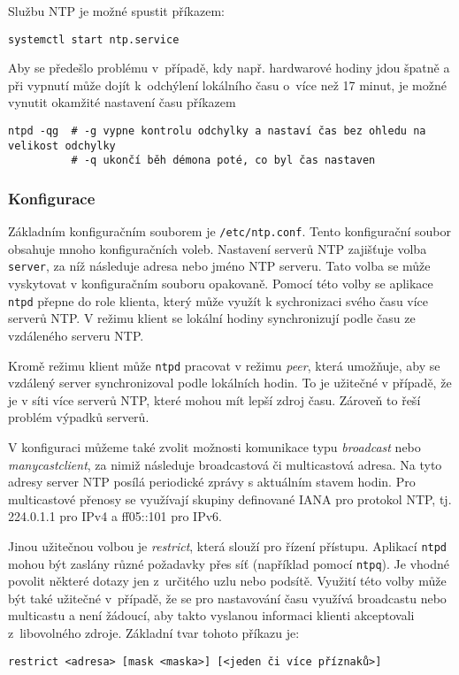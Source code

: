 Službu NTP je možné spustit příkazem:
\begin{verbatim}
systemctl start ntp.service
\end{verbatim}
Aby se předešlo problému v~případě, kdy např. hardwarové hodiny jdou špatně a při vypnutí může dojít k~odchýlení lokálního času o~více než 17 minut, je možné vynutit okamžité nastavení času příkazem
\begin{verbatim}
ntpd -qg  # -g vypne kontrolu odchylky a nastaví čas bez ohledu na velikost odchylky
          # -q ukončí běh démona poté, co byl čas nastaven
\end{verbatim}

\subsubsection{Konfigurace}
Základním konfiguračním souborem je {\tt /etc/ntp.conf}. Tento konfigurační soubor obsahuje mnoho
konfiguračních voleb. Nastavení serverů NTP zajišťuje volba {\tt server}, za níž následuje adresa nebo jméno NTP serveru. Tato volba se může vyskytovat v konfiguračním souboru opakovaně. Pomocí této volby se aplikace {\tt ntpd} přepne do role klienta, který může využít k sychronizaci svého času více serverů NTP. V režimu klient se lokální hodiny synchronizují podle času ze vzdáleného serveru NTP. 

Kromě režimu klient může {\tt ntpd} pracovat v režimu {\em peer}, která umožňuje, aby se vzdálený server synchronizoval podle lokálních hodin. To je užitečné v případě, že je v síti více serverů NTP, které mohou mít lepší zdroj času. Zároveň to řeší problém výpadků serverů. 

V konfiguraci můžeme také zvolit možnosti komunikace typu {\em broadcast} nebo {\em manycastclient}, za nimiž následuje broadcastová či multicastová adresa. Na tyto adresy server NTP posílá periodické zprávy s aktuálním stavem hodin. Pro multicastové přenosy se využívají skupiny definované IANA pro protokol NTP, tj. 224.0.1.1 pro IPv4 a ff05::101 pro IPv6. 

Jinou užitečnou volbou je {\em restrict}, která slouží pro řízení přístupu. Aplikací {\tt ntpd} mohou být zaslány různé požadavky přes síť (například pomocí {\tt ntpq}). Je vhodné povolit některé dotazy jen z~určitého uzlu nebo podsítě. Využití této volby může být také užitečné v~případě, že se pro nastavování času využívá broadcastu nebo multicastu a není žádoucí, aby takto vyslanou informaci klienti akceptovali z~libovolného zdroje. Základní tvar tohoto příkazu je:
\begin{verbatim}
restrict <adresa> [mask <maska>] [<jeden či více příznaků>]
\end{verbatim}

